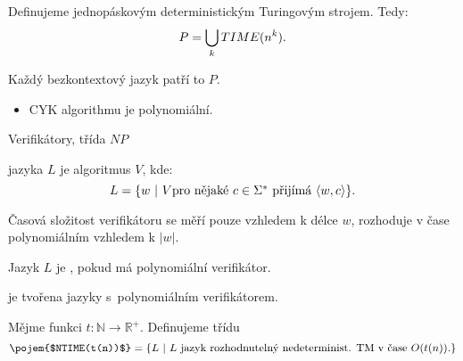     
    
    
    \begin{frame}%
    \begin{definition}[třída $P$]
    Definujeme   jednopáskovým deterministickým Turingovým strojem. Tedy:
    $$P=\bigcup_k TIME(n^k)\hbox{.}$$
    \end{definition}
    
    \begin{theorem}
    Každý bezkontextový jazyk patří to $P$.
    \end{theorem}
    \begin{itemize}
        \item CYK algorithmu je polynomiální.
    \end{itemize}
    
    \end{frame}
    
    
    
    
    
    
    
    
    
    \begin{frame}{Verifikátory, třída $NP$}
    
    \begin{definition}[Verifikátor]
     jazyka $L$ je algoritmus $V$, kde:
    $$L=
    \{ w\ | \ V \hbox{pro nějaké $c\in \Sigma^*$ přijímá }\langle w,c\rangle \}\hbox{.}
    $$
    
    Časová složitost verifikátoru se měří pouze vzhledem k délce $w$,  rozhoduje v čase polynomiálním vzhledem k $|w|$.
    
    Jazyk $L$ je , pokud má polynomiální verifikátor.
    
       je tvořena jazyky s~polynomiálním verifikátorem.
    \end{definition}
    
    
    \begin{definition}[$NP$]
    Mějme funkci $t: \mathbb{N}\to \mathbb{R}^+$. Definujeme třídu
    $$\hbox{\pojem{$NTIME(t(n))$}}=
    \{ L\ | \ L \hbox{ jazyk rozhodnutelný nedeterminist. TM v čase $O(t(n))$.}\}
    $$
    
    \end{definition}
    
    \end{frame}
    
